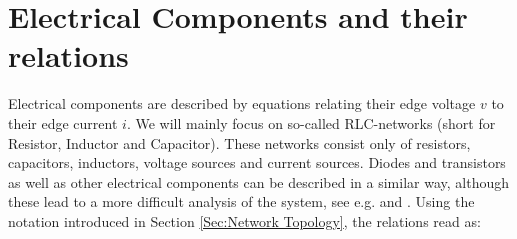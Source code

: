 \section{Electrical Components and their relations}
\label{Sec:Components relations}
Electrical components are described by equations relating their edge voltage $v$ to their edge current $i$. We will mainly focus on so-called RLC-networks (short for Resistor, Inductor and Capacitor). These networks consist only of resistors, capacitors, inductors, voltage sources and current sources. Diodes and transistors as well as other electrical components can be described in a similar way, although these lead to a more difficult analysis of the system, see e.g. \cite{ModellingAndDiscretizationOfCircuitProblems} and \cite{SchwarzTischendorfCircuitMNA}. Using the notation introduced in Section \ref{Sec:Network Topology}, the relations read as:
